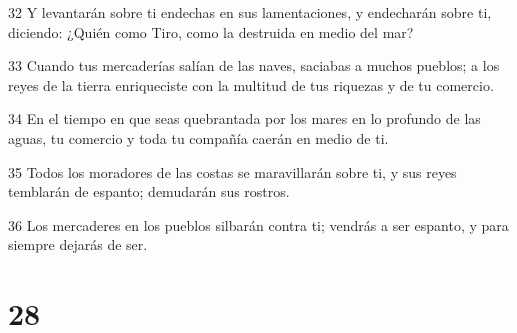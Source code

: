 \par 32 Y levantarán sobre ti endechas en sus lamentaciones, y endecharán sobre ti, diciendo: ¿Quién como Tiro, como la destruida en medio del mar?
\par 33 Cuando tus mercaderías salían de las naves, saciabas a muchos pueblos; a los reyes de la tierra enriqueciste con la multitud de tus riquezas y de tu comercio.
\par 34 En el tiempo en que seas quebrantada por los mares en lo profundo de las aguas, tu comercio y toda tu compañía caerán en medio de ti.
\par 35 Todos los moradores de las costas se maravillarán sobre ti, y sus reyes temblarán de espanto; demudarán sus rostros.
\par 36 Los mercaderes en los pueblos silbarán contra ti; vendrás a ser espanto, y para siempre dejarás de ser. 

\chapter{28}

